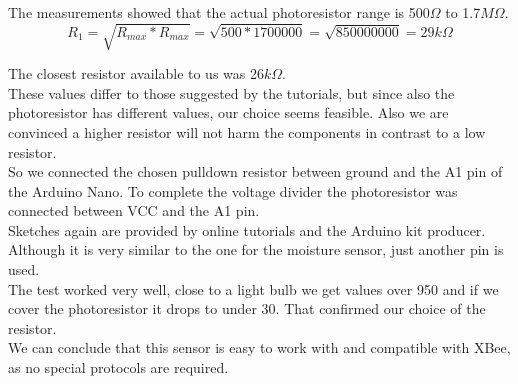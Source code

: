 \begin{itemize}
The measurements showed that the actual photoresistor range is 500$\Omega$ to 1.7$M\Omega$.\\
\begin{equation}
R_1 = \sqrt{R_{max}*R_{max}} = \sqrt{500*1700000} = \sqrt{850000000} = 29k\Omega
\end{equation}


The closest resistor available to us was 26$k\Omega$.\\
These values differ to those suggested by the tutorials, but since also the photoresistor has different values, our choice seems feasible. Also we are convinced a higher resistor will not harm the components in contrast to a low resistor.\\
So we connected the chosen pulldown resistor between ground and the A1 pin of the Arduino Nano. To complete the voltage divider the photoresistor was connected between VCC and the A1 pin.\\

Sketches again are provided by online tutorials and the Arduino kit producer. Although it is very similar to the one for the moisture sensor, just another pin is used.\\

The test worked very well, close to a light bulb we get values over 950 and if we cover the photoresistor it drops to under 30. That confirmed our choice of the resistor.\\

We can conclude that this sensor is easy to work with and compatible with XBee, as no special protocols are required.

\end{itemize}

